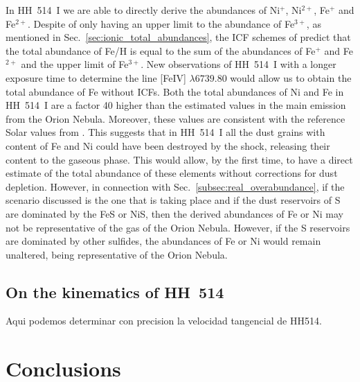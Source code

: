 \documentclass[fleqn,usenatbib]{mnras}
\begin{document}
In HH~514~I we are able to directly derive the abundances of Ni$^{+}$, Ni$^{2+}$, Fe$^{+}$ and Fe$^{2+}$. Despite of only having an upper limit to the abundance of Fe$^{3+}$, as mentioned in Sec.~\ref{sec:ionic_total_abundances}, the ICF schemes of \citet{rodriguez05} predict that the total abundance of Fe/H is equal to the sum of the abundances of Fe$^{+}$ and Fe$^{2+}$ and the upper limit of Fe$^{3+}$. New observations of HH~514~I with a longer exposure time to determine the line [Fe\thinspace IV] $\lambda 6739.80$ would allow us to obtain the total abundance of Fe without ICFs. Both the total abundances of Ni and Fe in HH~514~I are a factor 40 higher than the estimated values in the main emission from the Orion Nebula. Moreover, these values are consistent with the reference Solar values from \citet{lodders19}. This suggests that in HH~514~I all the dust grains with content of Fe and Ni could have been destroyed by the shock, releasing their content to the gaseous phase. This would allow, by the first time, to have a direct estimate of the total abundance of these elements without corrections for dust depletion. 
However, in connection with Sec.~\ref{subsec:real_overabundance}, if the scenario discussed is the one that is taking place and if the dust reservoirs of S are dominated by the FeS or NiS, then the derived abundances of Fe or Ni may not be representative of the gas of the Orion Nebula. However, if the S reservoirs are dominated by other sulfides, the abundances of Fe or Ni would remain unaltered, being representative of the Orion Nebula.


\subsection{On the kinematics of HH~514}
\label{subsec:kinematics}
Aqui podemos determinar con precision la velocidad tangencial de HH514. 

\section{Conclusions}
\label{sec:summary_and_conclusions}
\end{document}
